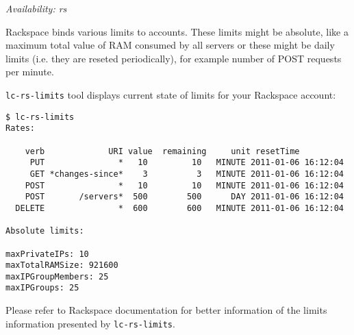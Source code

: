 \documentclass[a4paper]{report}
\begin{document}
\textit{Availability: rs}

Rackspace binds various limits to accounts. These limits might be absolute, like a
maximum total value of RAM consumed by all servers or these might be daily limits
(i.e. they are reseted periodically), for example number of POST requests per minute.

\texttt{lc-rs-limits} tool displays current state of limits for your Rackspace account:

\begin{verbatim}
$ lc-rs-limits
Rates:
    
    verb             URI value  remaining     unit resetTime
     PUT               *   10         10   MINUTE 2011-01-06 16:12:04
     GET *changes-since*    3          3   MINUTE 2011-01-06 16:12:04
    POST               *   10         10   MINUTE 2011-01-06 16:12:04
    POST       /servers*  500        500      DAY 2011-01-06 16:12:04
  DELETE               *  600        600   MINUTE 2011-01-06 16:12:04

Absolute limits:

maxPrivateIPs: 10
maxTotalRAMSize: 921600
maxIPGroupMembers: 25
maxIPGroups: 25
\end{verbatim}

Please refer to Rackspace documentation for better information of the
limits information presented by \texttt{lc-rs-limits}.
\end{document}
